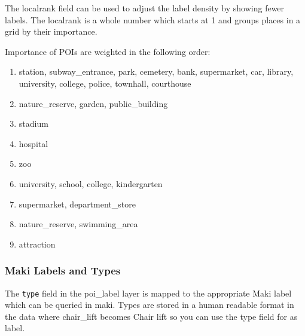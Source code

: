 The localrank field can be used to adjust the label density by showing
fewer labels. The localrank is a whole number which starts at 1 and
groups places in a grid by their importance.

Importance of POIs are weighted in the following order:

\begin{enumerate}
\def\labelenumi{\arabic{enumi}.}
\item
  station, subway\_entrance, park, cemetery, bank, supermarket, car,
  library, university, college, police, townhall, courthouse
\item
  nature\_reserve, garden, public\_building
\item
  stadium
\item
  hospital
\item
  zoo
\item
  university, school, college, kindergarten
\item
  supermarket, department\_store
\item
  nature\_reserve, swimming\_area
\item
  attraction
\end{enumerate}

\subsubsection*{Maki Labels and Types}\label{maki-labels-and-types}

The \texttt{type} field in the poi\_label layer is mapped to the appropriate Maki
label which can be queried in maki. Types are stored in a human readable
format in the data where chair\_lift becomes Chair lift so you can use
the type field for as label.
